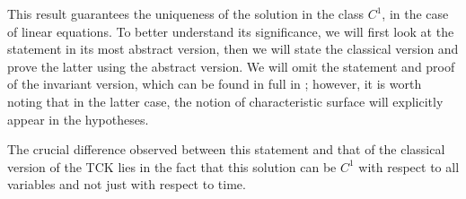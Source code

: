 This result guarantees the uniqueness of the solution in the class $C^1$, in the case of linear equations. To better understand its significance, we will first look at the statement in its most abstract version, then we will state the classical version and prove the latter using the abstract version. We will omit the statement and proof of the invariant version, which can be found in full in \cite[cap.21]{Treves}; however, it is worth noting that in the latter case, the notion of characteristic surface will explicitly appear in the hypotheses.

\begin{theorem}
\end{theorem}

\begin{theorem}
\end{theorem}

\begin{remark}
The crucial difference observed between this statement and that of the classical version of the TCK lies in the fact that this solution can be $C^1$ with respect to all variables and not just with respect to time.
\end{remark}

